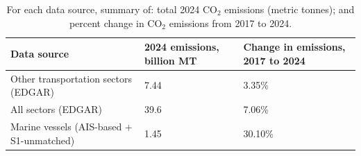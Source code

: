 \begin{table}[!h]
\centering
\caption{\label{tab:emissions_by_data_source_summary_tbl}For each data source, summary of: total 2024 CO$_2$ emissions (metric tonnes); and percent change in CO$_2$ emissions from 2017 to 2024.}
\centering
\fontsize{7}{9}\selectfont
\setlength{\tabcolsep}{3pt}
\begin{tabular}[t]{l|l|l}
\hline
Data source & 2024 emissions, billion MT & Change in emissions, 2017 to 2024\\
\hline
Other transportation sectors (EDGAR) & 7.44 & 3.35\%\\
\hline
All sectors (EDGAR) & 39.6 & 7.06\%\\
\hline
Marine vessels (AIS-based + S1-unmatched) & 1.45 & 30.10\%\\
\hline
\end{tabular}
\end{table}

